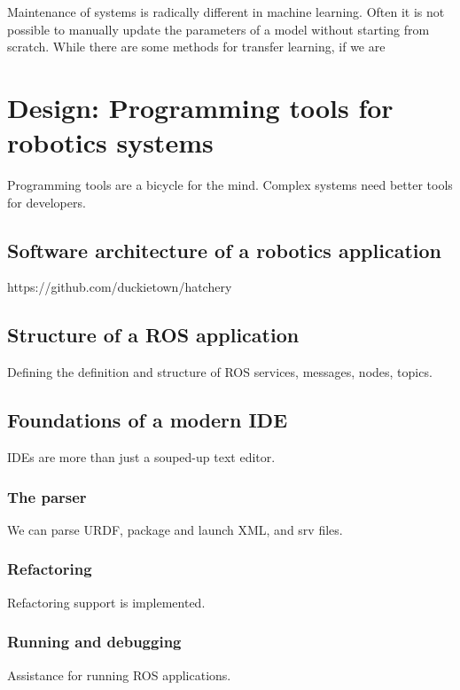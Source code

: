 \documentclass[12pt,initial,twoside,maitrise]{dms}
\numberwithin{equation}{section}
\numberwithin{table}{chapter}
\numberwithin{figure}{chapter}
\begin{document}
Maintenance of systems is radically different in machine learning. Often it is not possible to manually update the parameters of a model without starting from scratch. While there are some methods for transfer learning, if we are

\chapter{Design: Programming tools for robotics systems}

Programming tools are a bicycle for the mind. Complex systems need better tools for developers.

\section{Software architecture of a robotics application}

https://github.com/duckietown/hatchery

\section{Structure of a ROS application}

Defining the definition and structure of ROS services, messages, nodes, topics.

\section{Foundations of a modern IDE}

IDEs are more than just a souped-up text editor.

\subsection{The parser}

We can parse URDF, package and launch XML, and srv files.

\subsection{Refactoring}

Refactoring support is implemented.

\subsection{Running and debugging}

Assistance for running ROS applications.
\end{document}
